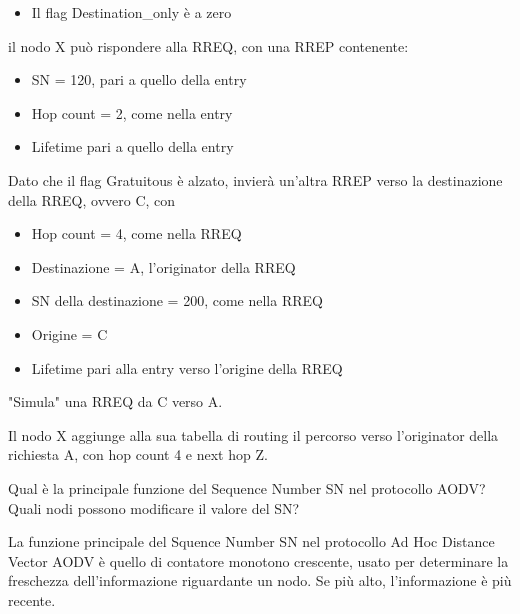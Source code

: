 \begin{questions}
\begin{solution}
\begin{itemize}
            \item Il flag Destination\_only è a zero
        \end{itemize}
        il nodo X può rispondere alla RREQ, con una RREP contenente: 
        \begin{itemize}
            \item SN = 120, pari a quello della entry
            
            \item Hop count = 2, come nella entry
            
            \item Lifetime pari a quello della entry
        \end{itemize}
        
        Dato che il flag Gratuitous è alzato, invierà un'altra RREP verso la destinazione della RREQ, ovvero C, con
        \begin{itemize}
            \item Hop count = 4, come nella RREQ
            
            \item Destinazione = A, l'originator della RREQ
            
            \item SN della destinazione = 200, come nella RREQ
            
            \item Origine = C
            
            \item Lifetime pari alla entry verso l'origine della RREQ
        \end{itemize}
        
        "Simula" una RREQ da C verso A.
        
        Il nodo X aggiunge alla sua tabella di routing il percorso verso l'originator della richiesta A, con hop count 4 e next hop Z.
    \end{solution}
    
    \question Qual è la principale funzione del Sequence Number SN nel protocollo AODV? Quali nodi possono modificare il valore del SN?
    
    \begin{solution}
        La funzione principale del Squence Number SN nel protocollo Ad Hoc Distance Vector AODV è quello di contatore monotono crescente, usato per determinare la freschezza dell'informazione riguardante un nodo. Se più alto, l'informazione è più recente.
        

\end{solution}
\end{questions}
